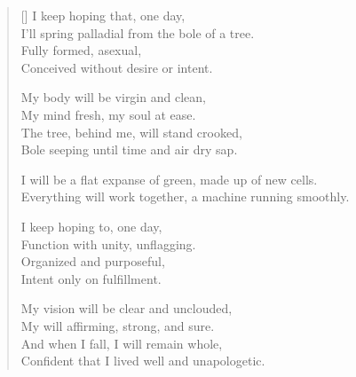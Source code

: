 \begin{verse}[\textwidth]
  I keep hoping that, one day,\\
  I'll spring palladial from the bole of a tree.\\
  Fully formed, asexual,\\
  Conceived without desire or intent.

  My body will be virgin and clean,\\
  My mind fresh, my soul at ease.\\
  The tree, behind me, will stand crooked,\\
  Bole seeping until time and air dry sap.

  I will be a flat expanse of green, made up of new cells.\\
  Everything will work together, a machine running smoothly.

  I keep hoping to, one day,\\
  Function with unity, unflagging.\\
  Organized and purposeful,\\
  Intent only on fulfillment.

  My vision will be clear and unclouded,\\
  My will affirming, strong, and sure.\\
  And when I fall, I will remain whole,\\
  Confident that I lived well and unapologetic.
\end{verse}
